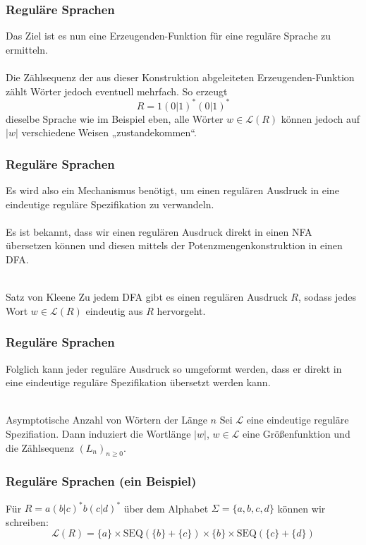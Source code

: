 \documentclass{beamer}
\begin{document}
\begin{frame}\frametitle{Reguläre Sprachen}
  Das Ziel ist es nun eine Erzeugenden-Funktion für eine reguläre Sprache zu ermitteln. \\
  \qquad \\
  Die Zählsequenz der aus dieser Konstruktion abgeleiteten Erzeugenden-Funktion zählt Wörter jedoch eventuell mehrfach. So erzeugt
  \[
    R = 1 (0 | 1)^* (0 | 1)^*
  \]
  dieselbe Sprache wie im Beispiel eben, alle Wörter $w \in \mathcal{L}(R)$ können jedoch auf $|w|$ verschiedene Weisen „zustandekommen“.
\end{frame}

\begin{frame}\frametitle{Reguläre Sprachen}
  Es wird also ein Mechanismus benötigt, um einen regulären Ausdruck in eine eindeutige reguläre Spezifikation zu verwandeln. \\
  \qquad \\
  Es ist bekannt, dass wir einen regulären Ausdruck direkt in einen NFA übersetzen können und diesen mittels der Potenzmengenkonstruktion in einen DFA. \\
  \qquad \\
  
  \begin{block}{Satz von Kleene}
    Zu jedem DFA gibt es einen regulären Ausdruck $R$, sodass jedes Wort $w \in \mathcal{L}(R)$ eindeutig aus $R$ hervorgeht.
  \end{block}
\end{frame}

\begin{frame}\frametitle{Reguläre Sprachen}
  Folglich kann jeder reguläre Ausdruck so umgeformt werden, dass er direkt in eine eindeutige reguläre Spezifikation übersetzt werden kann. \\
  \qquad \\
  \begin{block}{Asymptotische Anzahl von Wörtern der Länge $n$}
    Sei $\mathcal{L}$ eine eindeutige reguläre Spezifiation. Dann induziert die Wortlänge $|w|$, $w \in \mathcal{L}$ eine Größenfunktion und die Zählsequenz $(L_n)_{n \geq 0}$.
  \end{block}
\end{frame}

\begin{frame}\frametitle{Reguläre Sprachen (ein Beispiel)}
  Für $R = a (b|c)^* b (c|d)^*$ über dem Alphabet $\Sigma = \{ a, b, c, d \}$ können wir schreiben:
  \[
    \mathcal{L}(R) = \{ a \} \times \text{SEQ}(\{ b \} + \{ c \}) \times \{ b \} \times \text{SEQ}(\{ c \} + \{ d \})
  \]
\end{frame}
\end{document}
